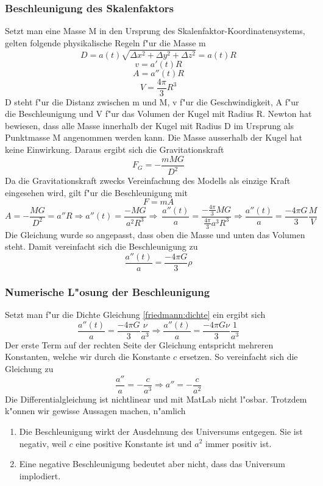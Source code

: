 \begin{refsection}
\subsubsection{Beschleunigung des Skalenfaktors}
Setzt man eine Masse M in den Ursprung des Skalenfaktor-Koordinatensystems, gelten folgende physikalische Regeln f"ur die Masse m 
\[D =  a(t) \sqrt{\Delta x^2 + \Delta y^2 + \Delta z^2}  = a(t) R\]
\[v = a'(t) R\]
\[A = a''(t) R\]
\[V = \frac{4 \pi }{3} R^3\]
D steht f"ur die Distanz zwischen m und M, v f"ur die Geschwindigkeit, A f"ur die Beschleunigung und V f"ur das Volumen der Kugel mit Radius R. Newton hat bewiesen, dass alle Masse innerhalb der Kugel mit Radius D im Ursprung als Punktmasse M angenommen werden kann. Die Masse ausserhalb der Kugel hat keine Einwirkung. Daraus ergibt sich die Gravitationskraft
\begin{equation}
F_G = -\frac{m M G}{D^2}
\end{equation}
Da die Gravitationskraft zwecks Vereinfachung des Modells als einzige Kraft eingesehen wird, gilt f"ur die Beschleunigung mit 
\[F = m A\]
\[A = - \frac{M G}{D^2} = a'' R \Rightarrow a''(t) = \frac{- M G}{a^2 R^3} \Rightarrow\ \frac{a''(t)}{a} = \frac{-\frac{4 \pi }{3} M G}{\frac{4 \pi}{3}a^3 R^3} \Rightarrow \frac{a''(t)}{a} = \frac{- 4 \pi G}{3} \frac{M}{V}\]
Die Gleichung wurde so angepasst, dass oben die Masse und unten das Volumen steht. Damit vereinfacht sich die Beschleunigung zu
\begin{equation}
\frac{a''(t)}{a} = \frac{- 4 \pi G}{3} \rho
\end{equation}
\subsubsection{Numerische L"osung der Beschleunigung}
Setzt man f"ur die Dichte Gleichung \ref{friedmann:dichte} ein ergibt sich
\[\frac{a''(t)}{a} = \frac{- 4 \pi G}{3} \frac{\nu}{a^3} \Rightarrow \frac{a''(t)}{a} = \frac{- 4 \pi G \nu}{3} \frac{1}{a^3}\]
Der erste Term auf der rechten Seite der Gleichung entspricht mehreren Konstanten, welche wir durch die Konstante $c$ ersetzen. So vereinfacht sich die Gleichung zu
\[\frac{a''}{a} = -\frac{c}{a^3} \Rightarrow a'' = -\frac{c}{a^2}\]
Die Differentialgleichung ist nichtlinear und mit MatLab nicht l"osbar. Trotzdem k"onnen wir gewisse Aussagen machen, n"amlich
\begin{enumerate}
	\item Die Beschleunigung wirkt der Ausdehnung des Universums entgegen. Sie ist negativ, weil $c$ eine positive Konstante ist und $a^2$  immer positiv ist. 
	\item Eine negative Beschleunigung bedeutet aber nicht, dass das Universum implodiert.
\end{enumerate}
\end{refsection}

